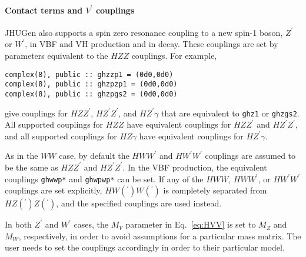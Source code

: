 \documentclass[aps,superscriptaddress,nofootinbib]{revtex4}
\begin{document}
\paragraph{Contact terms and $V^\prime$ couplings}
\label{contactterms}

JHUGen also supports a spin zero resonance coupling to a new spin-1 boson, $Z^\prime$ or $W^\prime$, in VBF and VH production and in decay.
These couplings are set by parameters equivalent to the $HZZ$ couplings.  For example,
\begin{verbatim}
complex(8), public :: ghzzp1 = (0d0,0d0)
complex(8), public :: ghzpzp1 = (0d0,0d0)
complex(8), public :: ghzpgs2 = (0d0,0d0)
\end{verbatim}
give couplings for $HZZ^\prime$, $HZ^\prime Z^\prime$, and $HZ^\prime\gamma$ that are equivalent to \verb|ghz1| or \verb|ghzgs2|.  All supported couplings for $HZZ$ have equivalent couplings for $HZZ^\prime$ and $HZ^\prime Z^\prime$, and all supported couplings for $HZ\gamma$ have equivalent couplings for $HZ^\prime\gamma$.

As in the $WW$ case, by default the $HWW^\prime$ and $HW^\prime W^\prime$ couplings are assumed to be the same as $HZZ^\prime$ and $HZ^\prime Z^\prime$.  In the VBF production, the equivalent couplings \verb|ghwwp*| and \verb|ghwpwp*| can be set.  If any of the $HWW$, $HWW^\prime$, or $HW^\prime W^\prime$ couplings are set explicitly, $HW({}^\prime)W(^{\prime})$ is completely separated from $HZ({}^\prime)Z(^{\prime})$, and the specified couplings are used instead.

In both $Z^\prime$ and $W^\prime$ cases, the $M_V$ parameter in Eq.~\ref{eq:HVV} is set to $M_Z$ and $M_W$, respectively, in order to avoid assumptions for a particular mass matrix. The user needs to set the couplings accordingly in order to their particular model.
\end{document}
